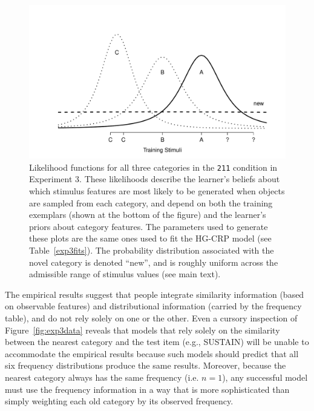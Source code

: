 \documentclass[doc]{apa6}
\newcommand{\dist}[1]{\texttt{#1}}
\begin{document}
\begin{figure}[t]
\begin{center}
\includegraphics[scale=.5]{similarities.pdf}
\caption{Likelihood functions for all three categories in the \dist{211} condition in Experiment 3. These likelihoods describe the learner's beliefs about which stimulus features are most likely to be generated when objects are sampled from each category, and depend on both the training exemplars (shown at the bottom of the figure) and the learner's priors about category features. The parameters used to generate these plots are the same ones used to fit the HG-CRP model (see Table~\protect\ref{exp3fits}). The probability distribution associated with the novel category is denoted ``new'', and is roughly uniform across the admissible range of stimulus values (see main text).}
\label{fig:exp3likelihood}
\end{center}
\end{figure}

The empirical results suggest that people integrate similarity information (based on observable features) and distributional information (carried by the frequency table), and do not rely solely on one or the other. Even a cursory inspection of Figure~\ref{fig:exp3data} reveals that models that rely solely on the similarity between the nearest category and the test item (e.g., SUSTAIN) will be unable to accommodate the empirical results because such models should predict that all six frequency distributions produce the same results. Moreover, because the nearest category always has the same frequency (i.e. $n=1$), any successful model must use the frequency information in a way that is more sophisticated than simply weighting each old category by its observed frequency.
\end{document}

